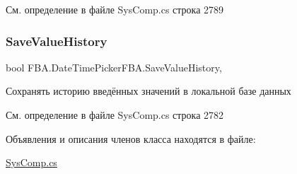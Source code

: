 См. определение в файле Sys\+Comp.\+cs строка 2789

\mbox{\label{class_f_b_a_1_1_date_time_picker_f_b_a_a8ce799d3a20bb7e9ff7efaa1ed706369}} 
\subsubsection{\texorpdfstring{Save\+Value\+History}{SaveValueHistory}}
{\footnotesize\ttfamily bool F\+B\+A.\+Date\+Time\+Picker\+F\+B\+A.\+Save\+Value\+History\hspace{0.3cm}{\ttfamily [get]}, {\ttfamily [set]}}



Сохранять историю введённых значений в локальной базе данных 



См. определение в файле Sys\+Comp.\+cs строка 2782



Объявления и описания членов класса находятся в файле\+:\begin{DoxyCompactItemize}
\item 
\mbox{\hyperlink{_sys_comp_8cs}{Sys\+Comp.\+cs}}\end{DoxyCompactItemize}
